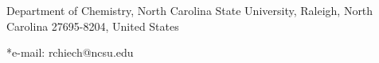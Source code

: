\begin{affiliations}
 	\item Department of Chemistry, North Carolina State University, Raleigh, North
Carolina 27695-8204, United States
	\item[] *e-mail: rchiech@ncsu.edu
\end{affiliations}